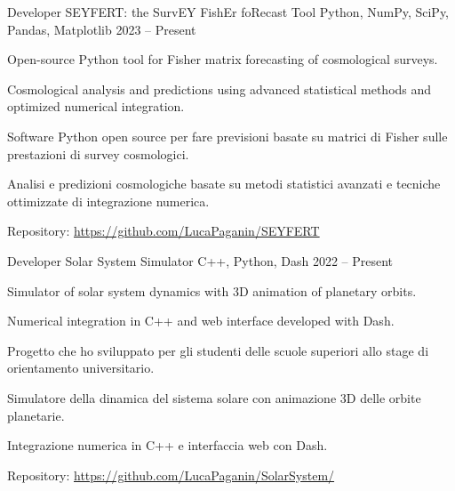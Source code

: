 

\begin{cventries}


\cventry
{Developer} %
{SEYFERT: the SurvEY FishEr foRecast Tool} %
{Python, NumPy, SciPy, Pandas, Matplotlib} %
{2023 -- Present} %
{ %
\begin{cvitems}
  \ifenglish
  \item {Open-source Python tool for Fisher matrix forecasting of cosmological surveys.}
  \item {Cosmological analysis and predictions using advanced statistical methods and optimized numerical integration.}
  \else
  \item {Software Python open source per fare previsioni basate su matrici di Fisher sulle prestazioni di survey cosmologici.}
  \item {Analisi e predizioni cosmologiche basate su metodi statistici avanzati e tecniche ottimizzate di integrazione numerica.}
  \fi
  \item {Repository: \url{https://github.com/LucaPaganin/SEYFERT}}
\end{cvitems}
}


\cventry
{Developer} %
{Solar System Simulator} %
{C++, Python, Dash} %
{2022 -- Present} %
{ %
\begin{cvitems}
    \ifenglish
    \item {Simulator of solar system dynamics with 3D animation of planetary orbits.}
    \item {Numerical integration in C++ and web interface developed with Dash.}
    \else
    \item {Progetto che ho sviluppato per gli studenti delle scuole superiori allo stage di orientamento universitario.}
    \item {Simulatore della dinamica del sistema solare con animazione 3D delle orbite planetarie.}
    \item {Integrazione numerica in C++ e interfaccia web con Dash.}
    \fi
    \item {Repository: \url{https://github.com/LucaPaganin/SolarSystem/}}  
\end{cvitems}
}


\end{cventries}
